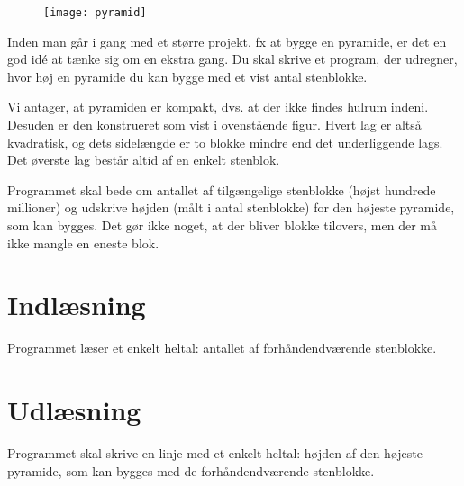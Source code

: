 
\begin{figure}[h!]
  \centering
  \texttt{[image: pyramid]}
\end{figure}

Inden man går i gang med et større projekt, fx at bygge en pyramide, er det en god idé at tænke sig om en ekstra gang.
Du skal skrive et program, der udregner, hvor høj en pyramide du kan bygge med et vist antal stenblokke.

Vi antager, at pyramiden er kompakt, dvs. at der ikke findes hulrum indeni.
Desuden er den konstrueret som vist i ovenstående figur.
Hvert lag er altså kvadratisk, og dets sidelængde er to blokke mindre end det underliggende lags.
Det øverste lag består altid af en enkelt stenblok.

Programmet skal bede om antallet af tilgængelige stenblokke (højst hundrede millioner) og udskrive højden (målt i antal stenblokke) for den højeste pyramide, som kan bygges.
Det gør ikke noget, at der bliver blokke tilovers, men der må ikke mangle en eneste blok.

\section*{Indlæsning}
Programmet læser et enkelt heltal: antallet af forhåndendværende stenblokke.

\section*{Udlæsning}
Programmet skal skrive en linje med et enkelt heltal: højden af den højeste pyramide, som kan bygges med de forhåndendværende stenblokke.
